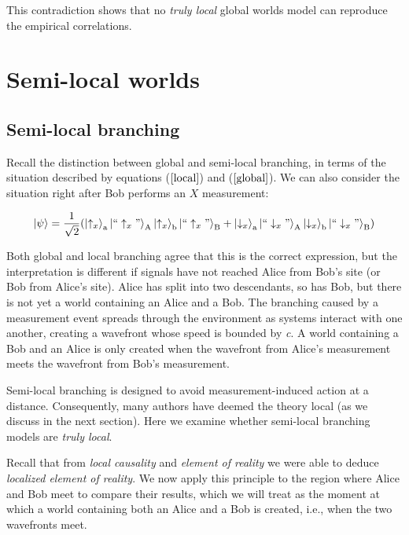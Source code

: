 \documentclass[a4paper]{article}
\begin{document}
\noindent This contradiction shows that no \textit{truly local} global worlds model can reproduce the empirical correlations.  


\section{Semi-local worlds}  \label{Semi}

\subsection{Semi-local branching}  \label{sec:SLocBranch}

Recall the distinction between global and semi-local branching, in terms of the situation described by equations ($\ref{local}$) and ($\ref{global}$). We can also consider the situation right after Bob performs an $X$ measurement:

\begin{equation}\label{local2}
\Ket{\psi} = \frac{1}{\sqrt 2}(\Ket{\uparrow_x}_{\rm a}\Ket{``\uparrow_x"}_{\rm A}\Ket{\uparrow_x}_{\rm b}\Ket{``\uparrow_x"}_{\rm B}+
\Ket{\downarrow_x}_{\rm a}\Ket{``\downarrow_x"}_{\rm A}\Ket{\downarrow_x}_{\rm b}\Ket{``\downarrow_x"}_{\rm B})
\end{equation}

Both global and local branching agree that this is the correct expression, but the interpretation is different if signals have not reached Alice from Bob's site (or Bob from Alice's site). Alice has split into two descendants, so has Bob, but there is not yet a world containing an Alice and a Bob. The branching caused by a measurement event spreads through the environment as systems interact with one another, creating a wavefront whose speed is bounded by \textit{c}. A world containing a Bob and an Alice is only created when the wavefront from Alice's measurement meets the wavefront from Bob's measurement. 

Semi-local branching is designed to avoid measurement-induced action at a distance. Consequently, many authors have deemed the theory local (as we discuss in the next section). Here we examine whether semi-local branching models are \textit{truly local}. 

Recall that from \textit{local causality} and \textit{element of reality} we were able to deduce \textit{localized element of reality}. We now apply this principle to the region where Alice and Bob meet to compare their results, which we will treat as the moment at which a world containing both an Alice and a Bob is created, i.e., when the two wavefronts meet.
\end{document}
